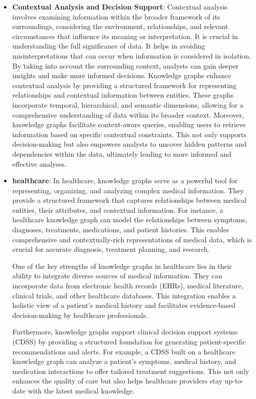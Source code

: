 \begin{itemize}
    \item \textbf{Contextual Analysis and Decision Support}:
    Contextual analysis involves examining information within the broader framework of its surroundings, considering the environment, relationships, and relevant circumstances that influence its meaning or interpretation. It is crucial in understanding the full significance of data. It helps in avoiding misinterpretations that can occur when information is considered in isolation. By taking into account the surrounding context, analysts can gain deeper insights and make more informed decisions. Knowledge graphs enhance contextual analysis by providing a structured framework for representing relationships and contextual information between entities. These graphs incorporate temporal, hierarchical, and semantic dimensions, allowing for a comprehensive understanding of data within its broader context. Moreover, knowledge graphs facilitate context-aware queries, enabling users to retrieve information based on specific contextual constraints. This not only supports decision-making but also empowers analysts to uncover hidden patterns and dependencies within the data, ultimately leading to more informed and effective analyses.

    \item \textbf{healthcare}:
    In healthcare, knowledge graphs serve as a powerful tool for representing, organizing, and analyzing complex medical information. They provide a structured framework that captures relationships between medical entities, their attributes, and contextual information. For instance, a healthcare knowledge graph can model the relationships between symptoms, diagnoses, treatments, medications, and patient histories. This enables comprehensive and contextually-rich representations of medical data, which is crucial for accurate diagnosis, treatment planning, and research.

    One of the key strengths of knowledge graphs in healthcare lies in their ability to integrate diverse sources of medical information. They can incorporate data from electronic health records (EHRs), medical literature, clinical trials, and other healthcare databases. This integration enables a holistic view of a patient's medical history and facilitates evidence-based decision-making by healthcare professionals.
    
    Furthermore, knowledge graphs support clinical decision support systems (CDSS) by providing a structured foundation for generating patient-specific recommendations and alerts. For example, a CDSS built on a healthcare knowledge graph can analyze a patient's symptoms, medical history, and medication interactions to offer tailored treatment suggestions. This not only enhances the quality of care but also helps healthcare providers stay up-to-date with the latest medical knowledge.
    

\end{itemize}

